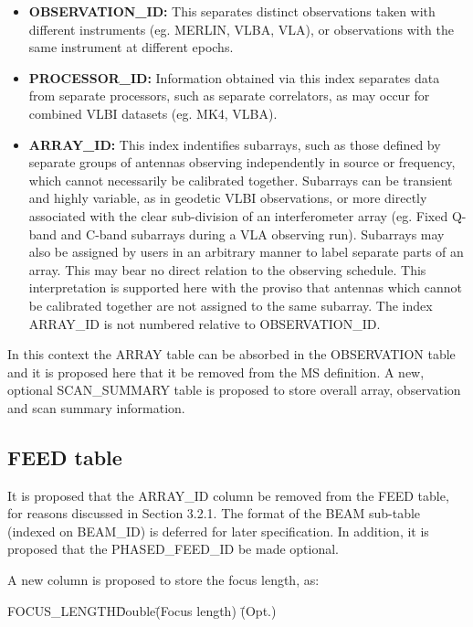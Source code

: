 \documentclass{article}
\begin{document}
\begin{itemize}

\item{{\bf OBSERVATION\_ID:} This separates distinct observations
taken with different instruments (eg. MERLIN, VLBA, VLA), or observations
with the same instrument at different epochs.}

\item{{\bf PROCESSOR\_ID:} Information obtained via this index
separates data from separate processors, such as separate correlators,
as may occur for combined VLBI datasets (eg. MK4, VLBA).}

\item{{\bf ARRAY\_ID:} This index indentifies subarrays, such as those
defined by separate groups of antennas observing independently in
source or frequency, which cannot necessarily be calibrated
together. Subarrays can be transient and highly variable, as in
geodetic VLBI observations, or more directly associated with the clear
sub-division of an interferometer array (eg. Fixed Q-band and C-band
subarrays during a VLA observing run). Subarrays may also be assigned
by users in an arbitrary manner to label separate parts of an
array. This may bear no direct relation to the observing
schedule. This interpretation is supported here with the proviso that
antennas which cannot be calibrated together are not assigned to the
same subarray. The index ARRAY\_ID is not numbered relative to
OBSERVATION\_ID.}

\end{itemize}

In this context the ARRAY table can be absorbed in the OBSERVATION
table and it is proposed here that it be removed from the MS
definition.  A new, optional SCAN\_SUMMARY table is proposed to store
overall array, observation and scan summary information.

\subsection{FEED table}

It is proposed that the ARRAY\_ID column be removed from the FEED
table, for reasons discussed in Section 3.2.1.  The format of the BEAM
sub-table (indexed on BEAM\_ID) is deferred for later specification.
In addition, it is proposed that the PHASED\_FEED\_ID be made optional.

A new column is proposed to store the focus length, as:

\begin{tabbing}
FOCUS\_LENGTH\quad\quad \= Double\quad\quad \= 
(Focus length) \quad\quad \= (Opt.) \\ 
\end{tabbing}
\end{document}
